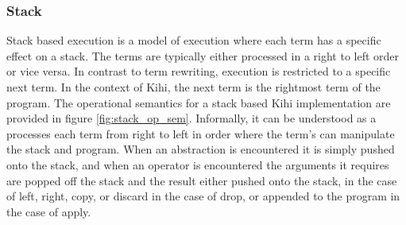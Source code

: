 \subsubsection{Stack}
Stack based execution is a model of execution where each term has a specific effect on a stack. The terms are typically either processed in a right to left order or vice versa. In contrast to term rewriting, execution is restricted to a specific next term. In the context of Kihi, the next term is the rightmost term of the program. The operational semantics for a stack based Kihi implementation are provided in figure \ref{fig:stack_op_sem}. Informally, it can be understood as a processes each term from right to left in order where the term's can manipulate the stack and program. When an abstraction is encountered it is simply pushed onto the stack, and when an operator is encountered the arguments it requires are popped off the stack and the result either pushed onto the stack, in the case of left, right, copy, or discard in the case of drop, or appended to the program in the case of apply.








